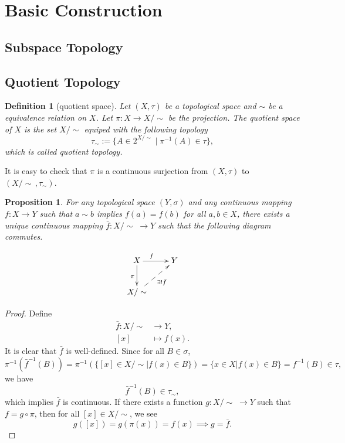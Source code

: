 \documentclass{report}
\newtheorem{definition}{Definition}[section]
\newtheorem{proposition}{Proposition}[section]
\theoremstyle{nonumberplain}
\newtheorem{proof}{Proof.}
\begin{document}
\section{Basic Construction}
\subsection{Subspace Topology}

\subsection{Quotient Topology}
\begin{definition}[quotient space]
	Let $(X,\tau)$ be a topological space and $\sim$ be a equivalence relation on $X$. Let $\pi:X\to X/\sim$ be the projection. 
	The \emph{quotient space} of $X$ is the set $X/\sim$ equiped with the following topology
	\[
	\tau_\sim:=\{A\in 2^{X/\sim}\mid \pi^{-1}(A)\in \tau\},
	\]
	which is called \emph{quotient topology}.
\end{definition}

It is easy to check that $\pi$ is a continuous surjection from $(X,\tau)$ to $(X/\sim\,,\tau_\sim)$.

\begin{proposition}
	 For any topological space $(Y,\sigma)$ and any continuous mapping $f:X\to Y$ such that $a\sim b$ implies $f(a) = f(b)$ for all $a,b \in X$, there exists a unique continuous mapping $\bar{f}:X/\sim\;\to Y$ such that the following diagram commutes.
	
	\[\xymatrix{
		X\ar[r]^{f\quad}\ar[d]_{\pi}  &Y\\
		X/\sim\ar@{-->}[ru]_{\exists!\bar{f}}&  
	}\]
\end{proposition}


\begin{proof}
	Define
	\begin{align*}
		\bar{f}:X/\sim&\longrightarrow Y,\\
		[x]&\longmapsto f(x).
	\end{align*}
	It is clear that $\bar{f}$ is well-defined. Since for all $B\in \sigma$,
	\[
	\pi^{-1}\left(\bar{f}^{-1}(B)\right)=\pi^{-1}\left(\{[x]\in X/\sim| f(x)\in B\}\right)=\{x\in X| f(x)\in B\}=f^{-1}(B)\in \tau,
	\]
	we have
	\[
	\bar{f}^{-1}(B)\in \tau_\sim,
	\]
	which implies $\bar{f}$ is continuous. If there exists a function $g:X/\sim\;\to Y$ such that $f=g\circ\pi$, then for all $[x]\in X/\sim$, we see
	\[
	g([x])=g(\pi(x))=f(x)\implies g=\bar{f}.
	\]
\end{proof}
\end{document}
